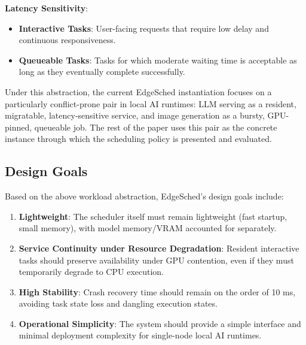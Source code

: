 \textbf{Latency Sensitivity}:
\begin{itemize}
\item \textbf{Interactive Tasks}: User-facing requests that require low delay and continuous responsiveness.
\item \textbf{Queueable Tasks}: Tasks for which moderate waiting time is acceptable as long as they eventually complete successfully.
\end{itemize}

Under this abstraction, the current EdgeSched instantiation focuses on a particularly conflict-prone pair in local AI runtimes: LLM serving as a resident, migratable, latency-sensitive service, and image generation as a bursty, GPU-pinned, queueable job. The rest of the paper uses this pair as the concrete instance through which the scheduling policy is presented and evaluated.

\subsection{Design Goals}

Based on the above workload abstraction, EdgeSched's design goals include:

\begin{enumerate}
\item \textbf{Lightweight}: The scheduler itself must remain lightweight (fast startup, small memory), with model memory/VRAM accounted for separately.
\item \textbf{Service Continuity under Resource Degradation}: Resident interactive tasks should preserve availability under GPU contention, even if they must temporarily degrade to CPU execution.
\item \textbf{High Stability}: Crash recovery time should remain on the order of 10 ms, avoiding task state loss and dangling execution states.
\item \textbf{Operational Simplicity}: The system should provide a simple interface and minimal deployment complexity for single-node local AI runtimes.
\end{enumerate}
